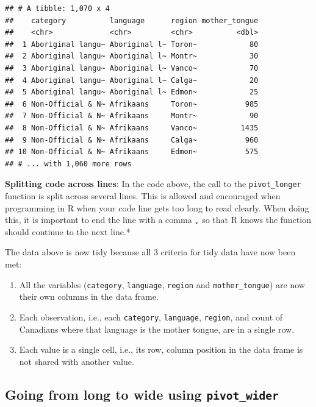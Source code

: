 \documentclass[
]{krantz}
\providecommand{\tightlist}{%
  \setlength{\itemsep}{0pt}\setlength{\parskip}{0pt}}
\renewenvironment{quote}{\begin{VF}}{\end{VF}}
\begin{document}
\begin{verbatim}
## # A tibble: 1,070 x 4
##    category          language      region mother_tongue
##    <chr>             <chr>         <chr>          <dbl>
##  1 Aboriginal langu~ Aboriginal l~ Toron~            80
##  2 Aboriginal langu~ Aboriginal l~ Montr~            30
##  3 Aboriginal langu~ Aboriginal l~ Vanco~            70
##  4 Aboriginal langu~ Aboriginal l~ Calga~            20
##  5 Aboriginal langu~ Aboriginal l~ Edmon~            25
##  6 Non-Official & N~ Afrikaans     Toron~           985
##  7 Non-Official & N~ Afrikaans     Montr~            90
##  8 Non-Official & N~ Afrikaans     Vanco~          1435
##  9 Non-Official & N~ Afrikaans     Calga~           960
## 10 Non-Official & N~ Afrikaans     Edmon~           575
## # ... with 1,060 more rows
\end{verbatim}

\begin{quote}
\textbf{Splitting code across lines}: In the code above, the call to the \texttt{pivot\_longer} function is split across several lines.\emph{
}This is allowed and encouraged when programming in R when your code line gets too long\emph{
}to read clearly. When doing this, it is important to end the line with a comma \texttt{,} so that R\emph{
}knows the function should continue to the next line.*
\end{quote}

The data above is now tidy because all 3 criteria for tidy data have now been met:

\begin{enumerate}
\def\labelenumi{\arabic{enumi}.}
\tightlist
\item
  All the variables (\texttt{category}, \texttt{language}, \texttt{region} and \texttt{mother\_tongue}) are now their own columns in the data frame.
\item
  Each observation, i.e., each \texttt{category}, \texttt{language}, \texttt{region}, and count of Canadians where that language is the mother tongue, are in a single row.
\item
  Each value is a single cell, i.e., its row, column position in the data frame is not shared with another value.
\end{enumerate}

\hypertarget{going-from-long-to-wide-using-pivot_wider}{%
\subsection{\texorpdfstring{Going from long to wide using \texttt{pivot\_wider}}{Going from long to wide using pivot\_wider}}\label{going-from-long-to-wide-using-pivot_wider}}
\end{document}
